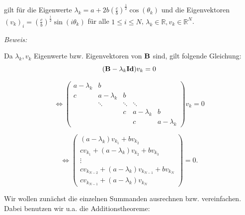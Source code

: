 gilt für die Eigenwerte $\lambda_{k} = a + 2b\left(\frac{c}{b}\right)^{\frac{1}{2}} \cos(\theta_{k})$ und die Eigenvektoren\\
$(v_{k})_{i} = \left(\frac{c}{b}\right)^{\frac{i}{2}} \sin(i \theta_{k})$ für alle $1 \le i \le N$, $\lambda_{k} \in \mathbb{R}, v_{k} \in \mathbb{R}^{N}$.

\textit{Beweis:}

Da $\lambda_{k}, v_{k}$ Eigenwerte bzw. Eigenvektoren von ${\textbf{B}}$ sind, gilt folgende Gleichung:
\begin{equation}
({\textbf{B}} - \lambda_{k} {\textbf{Id}}) v_{k} = 0
\end{equation}

\begin{equation}
\Longleftrightarrow
\begin{pmatrix}
a - \lambda_{k} & b\\
c & a - \lambda_{k} & b\\
  & \ddots & \ddots & \ddots\\
  &		   & c & a - \lambda_{k} & b\\
  &		   &  & c & a - \lambda_{k}
\end{pmatrix}
v_{k} = 0
\end{equation}

\begin{equation}
\Longleftrightarrow
\begin{pmatrix}
(a - \lambda_{k}) v_{k_{1}} + b v_{k_{2}}\\
c v_{k_{1}} + (a - \lambda_{k}) v_{k_{2}} + b v_{k_{3}}\\
\vdots\\
c v_{k_{N-2}} + (a - \lambda_{k}) v_{k_{N-1}} + b v_{k_{N}}\\
c v_{k_{N-1}} + (a - \lambda_{k}) v_{k_{N}}
\end{pmatrix}
= 0.
\end{equation}

Wir wollen zunächst die einzelnen Summanden ausrechnen bzw. vereinfachen. Dabei benutzen wir u.a. die Additionstheoreme:

